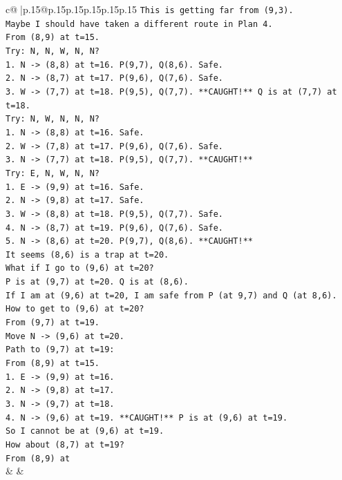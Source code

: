 \documentclass{article}
\begin{document}
{\begin{supertabular}{c@{$\;$}|p{.15\linewidth}@{}p{.15\linewidth}p{.15\linewidth}p{.15\linewidth}p{.15\linewidth}p{.15\linewidth}}
{{{\texttt{This is getting far from (9,3).} \\
\texttt{Maybe I should have taken a different route in Plan 4.} \\
\texttt{From (8,9) at t=15.} \\
\texttt{Try: N, N, W, N, N?} \\
\texttt{1. N {-}> (8,8) at t=16. P(9,7), Q(8,6). Safe.} \\
\texttt{2. N {-}> (8,7) at t=17. P(9,6), Q(7,6). Safe.} \\
\texttt{3. W {-}> (7,7) at t=18. P(9,5), Q(7,7). **CAUGHT!** Q is at (7,7) at t=18.} \\
\texttt{Try: N, W, N, N, N?} \\
\texttt{1. N {-}> (8,8) at t=16. Safe.} \\
\texttt{2. W {-}> (7,8) at t=17. P(9,6), Q(7,6). Safe.} \\
\texttt{3. N {-}> (7,7) at t=18. P(9,5), Q(7,7). **CAUGHT!**} \\
\texttt{Try: E, N, W, N, N?} \\
\texttt{1. E {-}> (9,9) at t=16. Safe.} \\
\texttt{2. N {-}> (9,8) at t=17. Safe.} \\
\texttt{3. W {-}> (8,8) at t=18. P(9,5), Q(7,7). Safe.} \\
\texttt{4. N {-}> (8,7) at t=19. P(9,6), Q(7,6). Safe.} \\
\texttt{5. N {-}> (8,6) at t=20. P(9,7), Q(8,6). **CAUGHT!**} \\
\texttt{It seems (8,6) is a trap at t=20.} \\
\texttt{What if I go to (9,6) at t=20?} \\
\texttt{P is at (9,7) at t=20. Q is at (8,6).} \\
\texttt{If I am at (9,6) at t=20, I am safe from P (at 9,7) and Q (at 8,6).} \\
\texttt{How to get to (9,6) at t=20?} \\
\texttt{From (9,7) at t=19.} \\
\texttt{Move N {-}> (9,6) at t=20.} \\
\texttt{Path to (9,7) at t=19:} \\
\texttt{From (8,9) at t=15.} \\
\texttt{1. E {-}> (9,9) at t=16.} \\
\texttt{2. N {-}> (9,8) at t=17.} \\
\texttt{3. N {-}> (9,7) at t=18.} \\
\texttt{4. N {-}> (9,6) at t=19. **CAUGHT!** P is at (9,6) at t=19.} \\
\texttt{So I cannot be at (9,6) at t=19.} \\
\texttt{How about (8,7) at t=19?} \\
\texttt{From (8,9) at} \\
            }
        }
    }
    & & \\ \\


\end{supertabular}}
\end{document}

